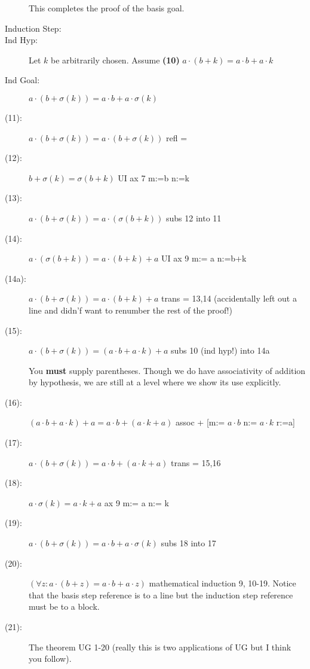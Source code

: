 \documentclass[12pt]{book}
\begin{document}
\begin{description}
This completes the proof of the basis goal.

\item[Induction Step:]

\item[Ind Hyp:]  Let $k$ be arbitrarily chosen.  Assume {\bf (10)} $a\cdot(b+k) = a \cdot b + a \cdot k$

\item[Ind Goal:]  $a\cdot(b+\sigma(k)) = a \cdot b + a \cdot \sigma(k)$

\item [(11):]  $a\cdot(b+\sigma(k)) = a\cdot(b+\sigma(k))$  refl =

\item[(12):]   $b + \sigma(k) = \sigma(b+k)$  UI ax 7 m:=b n:=k

\item[(13):]  $a\cdot(b+\sigma(k)) = a\cdot(\sigma(b+k))$  subs 12 into 11

\item[(14):]  $a\cdot(\sigma(b+k)) = a\cdot(b+k) +a$  UI ax 9 m:= a n:=b+k

\item[(14a):] $a\cdot(b+\sigma(k)) =  a\cdot(b+k) +a$ trans = 13,14 (accidentally left out a line and didn'f want to renumber the rest of the proof!)

\item[(15):]   $a\cdot(b+\sigma(k)) = (a\cdot b + a \cdot k)+ a$  subs 10 (ind hyp!) into 14a  

You {\bf must} supply parentheses.  Though we do have associativity of addition by hypothesis, we are still at a level where we show its use
explicitly.

\item[(16):]  $(a\cdot b + a \cdot k)+ a = a\cdot b + (a \cdot k+ a)$  assoc + [m:= $a \cdot b$ n:= $a \cdot k$ r:=a]

\item[(17):]   $a\cdot(b+\sigma(k)) = a\cdot b + (a \cdot k+ a)$ trans = 15,16

\item[(18):]   $a \cdot \sigma(k) = a\cdot k + a$  ax 9 m:= a n:= k

\item[(19):]  $a\cdot(b+\sigma(k)) = a \cdot b + a \cdot \sigma(k)$  subs 18 into 17

\item[(20):]  $(\forall z:a\cdot (b+z) = a \cdot b + a \cdot z)$  mathematical induction 9, 10-19.  Notice that the basis step reference is to a line but the induction step reference must be to a block.

\item[(21):]  The theorem UG 1-20 (really this is two applications of UG but I think you follow).

\end{description}
\end{document}
